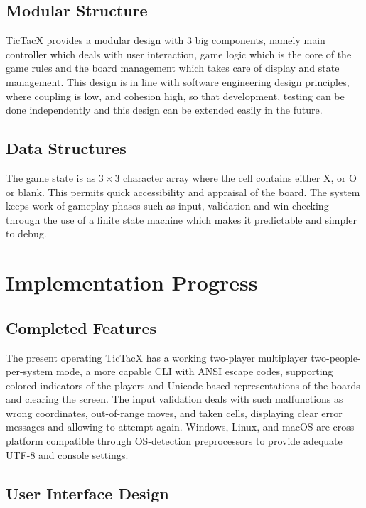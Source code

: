 \documentclass[11pt,a4paper,twocolumn]{article}
\begin{document}
\subsection{Modular Structure}

TicTacX provides a modular design with 3 big components, namely main controller which deals with user interaction, game logic which is the core of the game rules and the board management which takes care of display and state management. This design is in line with software engineering design principles, where coupling is low, and cohesion high, so that development, testing can be done independently and this design can be extended easily in the future.

\subsection{Data Structures}

The game state is as $3 \times 3$ character array where the cell contains either X, or O or blank. This permits quick accessibility and appraisal of the board. The system keeps work of gameplay phases such as input, validation and win checking through the use of a finite state machine which makes it predictable and simpler to debug.

\section{Implementation Progress}

\subsection{Completed Features}

The present operating TicTacX has a working two-player multiplayer two-people-per-system mode, a more capable CLI with ANSI escape codes, supporting colored indicators of the players and Unicode-based representations of the boards and clearing the screen. The input validation deals with such malfunctions as wrong coordinates, out-of-range moves, and taken cells, displaying clear error messages and allowing to attempt again. Windows, Linux, and macOS are cross-platform compatible through OS-detection preprocessors to provide adequate UTF-8 and console settings.

\subsection{User Interface Design}
\end{document}
